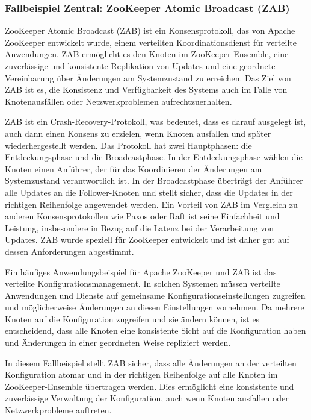 \documentclass[../vs-script-first-v01.tex]{subfiles}
\begin{document}
\subsubsection{Fallbeispiel Zentral: ZooKeeper Atomic Broadcast (ZAB)}

ZooKeeper Atomic Broadcast (ZAB) ist ein Konsensprotokoll, das von Apache ZooKeeper entwickelt wurde, einem verteilten Koordinationsdienst für verteilte Anwendungen. ZAB ermöglicht es den Knoten im ZooKeeper-Ensemble, eine zuverlässige und konsistente Replikation von Updates und eine geordnete Vereinbarung über Änderungen am Systemzustand zu erreichen. Das Ziel von ZAB ist es, die Konsistenz und Verfügbarkeit des Systems auch im Falle von Knotenausfällen oder Netzwerkproblemen aufrechtzuerhalten.

ZAB ist ein Crash-Recovery-Protokoll, was bedeutet, dass es darauf ausgelegt ist, auch dann einen Konsens zu erzielen, wenn Knoten ausfallen und später wiederhergestellt werden. Das Protokoll hat zwei Hauptphasen: die Entdeckungsphase und die Broadcastphase. In der Entdeckungsphase wählen die Knoten einen Anführer, der für das Koordinieren der Änderungen am Systemzustand verantwortlich ist. In der Broadcastphase überträgt der Anführer alle Updates an die Follower-Knoten und stellt sicher, dass die Updates in der richtigen Reihenfolge angewendet werden.
Ein Vorteil von ZAB im Vergleich zu anderen Konsensprotokollen wie Paxos oder Raft ist seine Einfachheit und Leistung, insbesondere in Bezug auf die Latenz bei der Verarbeitung von Updates. ZAB wurde speziell für ZooKeeper entwickelt und ist daher gut auf dessen Anforderungen abgestimmt.

Ein häufiges Anwendungsbeispiel für Apache ZooKeeper und ZAB ist das verteilte Konfigurationsmanagement. In solchen Systemen müssen verteilte Anwendungen und Dienste auf gemeinsame Konfigurationseinstellungen zugreifen und möglicherweise Änderungen an diesen Einstellungen vornehmen. Da mehrere Knoten auf die Konfiguration zugreifen und sie ändern können, ist es entscheidend, dass alle Knoten eine konsistente Sicht auf die Konfiguration haben und Änderungen in einer geordneten Weise repliziert werden.

In diesem Fallbeispiel stellt ZAB sicher, dass alle Änderungen an der verteilten Konfiguration atomar und in der richtigen Reihenfolge auf alle Knoten im ZooKeeper-Ensemble übertragen werden. Dies ermöglicht eine konsistente und zuverlässige Verwaltung der Konfiguration, auch wenn Knoten ausfallen oder Netzwerkprobleme auftreten.
\end{document}
